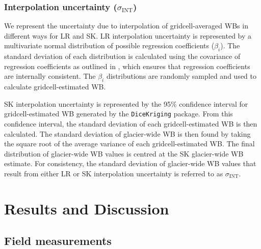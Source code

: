 \documentclass[twocolumn, letterpaper]{igs}
\begin{document}
	\subsubsection{Interpolation uncertainty ($\sigma_{\mathrm{INT}}$)}
We represent the uncertainty due to interpolation of gridcell-averaged WBs  in different ways for LR and SK. LR interpolation uncertainty is represented by a multivariate normal distribution of possible regression coefficients ($\beta_i$). The standard deviation of each distribution is calculated using the covariance of regression coefficients as outlined in \cite{Bagos2015}, which ensures that regression coefficients are internally consistent. The $\beta_i$ distributions are randomly sampled and used to calculate gridcell-estimated WB.

SK interpolation uncertainty is represented by the 95\% confidence interval for gridcell-estimated WB generated by the \texttt{DiceKriging} package. From this confidence interval, the standard deviation of each gridcell-estimated WB is then calculated. The standard deviation of glacier-wide WB is then found by taking the square root of the average variance of each gridcell-estimated WB. The final distribution of glacier-wide WB values is centred at the SK glacier-wide WB estimate. For consistency, the standard deviation of glacier-wide WB values that result from either LR or SK interpolation uncertainty is referred to as $\sigma_{\mathrm{INT}}$.



\section{Results and Discussion}

\subsection{Field measurements}
\end{document}

